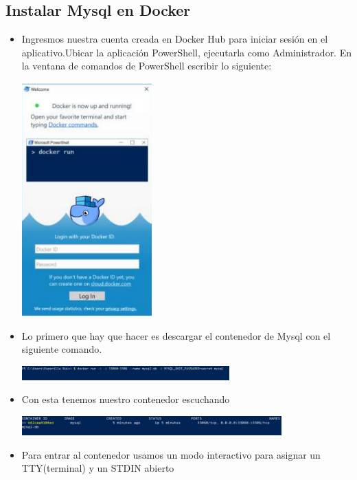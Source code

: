 \documentclass[%
 reprint,
 amsmath,amssymb,
 aps,
]{revtex4-1}
\begin{document}
\subsection{Instalar Mysql en Docker}
     \begin{itemize}
                     \item Ingresmos nuestra cuenta creada en Docker Hub para iniciar sesión en el aplicativo.Ubicar la aplicación PowerShell, ejecutarla como Administrador. En la ventana de comandos de PowerShell escribir lo siguiente:
                     \begin{center}
		\includegraphics[width=5cm]{./Imagenes/8}
		\end{center}	
		\item Lo primero que hay que hacer es descargar el contenedor de Mysql con el siguiente comando.
                     \begin{center}
		\includegraphics[width=8cm]{./Imagenes/14}
		\end{center}	
		\item Con esta tenemos nuestro contenedor escuchando
                     \begin{center}
		\includegraphics[width=10cm]{./Imagenes/9}
		\end{center}	
                     \item Para entrar al contenedor usamos un modo interactivo para asignar un TTY(terminal) y un STDIN abierto
                     \begin{center}

\end{center}
\end{itemize}
\end{document}
